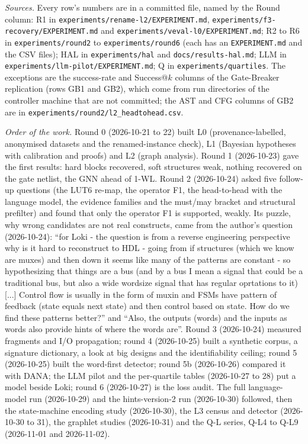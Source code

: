 \documentclass[conference]{IEEEtran}
\newcommand{\code}[1]{\texttt{#1}}
\begin{document}
\emph{Sources.} Every row's numbers are in a committed file, named by the Round column: R1 in
\code{experiments/rename-l2/EXPERIMENT.md}, \code{experiments/f3-recovery/EXPERIMENT.md} and
\code{experiments/veval-l0/EXPERIMENT.md}; R2 to R6 in \code{experiments/round2} to \code{experiments/round6}
(each has an \code{EXPERIMENT.md} and the CSV files); HAL in \code{experiments/hal} and \code{docs/results-hal.md};
LLM in \code{experiments/llm-pilot/EXPERIMENT.md}; Q in \code{experiments/quartiles}. The exceptions are
the success-rate and Success@$k$ columns of the Gate-Breaker replication (rows GB1 and GB2), which come from
run directories of the controller machine that are not committed; the AST and CFG columns of GB2 are in
\code{experiments/round2/l2\_headtohead.csv}.

\emph{Order of the work.} Round 0 (2026-10-21 to 22) built L0 (provenance-labelled, anonymised datasets and
the renamed-instance check), L1 (Bayesian hypotheses with calibration and proofs) and L2 (graph analysis).
Round 1 (2026-10-23) gave the first results: hard blocks recovered, soft structures weak, nothing recovered
on the gate netlist, the GNN ahead of 1-WL. Round 2 (2026-10-24) asked five follow-up questions (the LUT6
re-map, the operator F1, the head-to-head with the language model, the evidence families and the must/may
bracket and structural prefilter) and found that only the operator F1 is supported, weakly. Its
puzzle, why wrong candidates are not real constructs, came from the author's question (2026-10-24): ``for Loki -
the question is from a reverse engineering perspective why is it hard to reconstruct to HDL - going from if
structures (which we know are muxes) and then down it seems like many of the patterns are constant - so
hypothesizing that things are a bus (and by a bus I mean a signal that could be a traditional bus, but also a
wide wordsize signal that has regular oprtations to it) [...] Control flow is usually in the form of muxin and
FSMs have pattern of feedback (state equals next state) and then control based on state. How do we find these
patterns better?'' and ``Also, the outputs (words) and the inputs as words also provide hints of where the
words are''. Round 3 (2026-10-24) measured fragments and I/O propagation; round 4 (2026-10-25) built a synthetic
corpus, a signature dictionary, a look at big designs and the identifiability ceiling; round 5 (2026-10-25)
built the word-first detector; round 5b (2026-10-26) compared it with DANA; the LLM pilot and the per-quartile
tables (2026-10-27 to 28) put a model beside Loki; round 6 (2026-10-27) is the loss audit. The full language-model run (2026-10-29) and the hints-version-2 run (2026-10-30) followed, then the state-machine encoding study (2026-10-30), the L3 census and detector (2026-10-30 to 31), the graphlet studies (2026-10-31) and the Q-L series, Q-L4 to Q-L9 (2026-11-01 and 2026-11-02).





\end{document}
